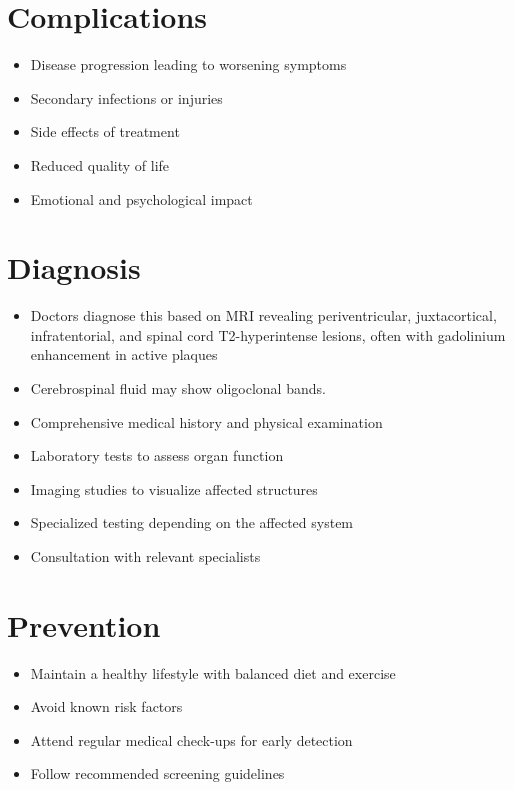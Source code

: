 \section{Complications}
\begin{itemize}[noitemsep]
  \item Disease progression leading to worsening symptoms
  \item Secondary infections or injuries
  \item Side effects of treatment
  \item Reduced quality of life
  \item Emotional and psychological impact
\end{itemize}
\section{Diagnosis}
\begin{itemize}[noitemsep]
  \item Doctors diagnose this based on MRI revealing periventricular, juxtacortical, infratentorial, and spinal cord T2-hyperintense lesions, often with gadolinium enhancement in active plaques
  \item Cerebrospinal fluid may show oligoclonal bands.
  \item Comprehensive medical history and physical examination
  \item Laboratory tests to assess organ function
  \item Imaging studies to visualize affected structures
  \item Specialized testing depending on the affected system
  \item Consultation with relevant specialists
\end{itemize}
\section{Prevention}
\begin{itemize}[noitemsep]
  \item Maintain a healthy lifestyle with balanced diet and exercise
  \item Avoid known risk factors
  \item Attend regular medical check-ups for early detection
  \item Follow recommended screening guidelines
\end{itemize}
